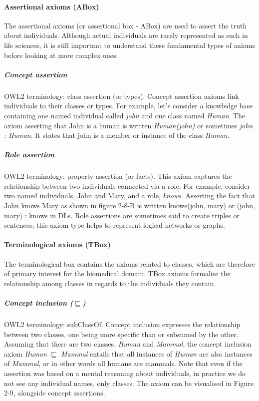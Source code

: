 \paragraph{\textbf{Assertional axioms (ABox)}\\}
The assertional axioms (or assertional box - ABox) are used to assert the truth about individuals. Although actual individuals are rarely represented as such in life sciences, it is still important to understand these fundamental types of axioms before looking at more complex ones.

\subparagraph{Concept assertion\\}
OWL2 terminology: class assertion (or types). Concept assertion axioms link individuals to their classes or types. For example, let's consider a knowledge base containing one named individual called \emph{john} and one class named \emph{Human}. The axiom asserting that John is a human is written \emph{Human(john)} or sometimes \emph{john : Human}. It states that john is a member or instance of the class \emph{Human}.

\subparagraph{Role assertion\\}
OWL2 terminology: property assertion (or facts). This axiom captures the relationship between two individuals connected via a role. For example, consider two named individuals, John and Mary, and a role, \emph{knows}. Asserting the fact that John knows Mary as shown in figure 2-8-B is written knows(john, mary) or (john, mary) : knows in DLs. Role assertions are sometimes said to create triples or sentences; this axiom type helps to represent logical networks or graphs.

\paragraph{\textbf{Terminological axioms (TBox)}\\}

The terminological box contains the axioms related to classes, which are therefore of primary interest for the biomedical domain. TBox axioms formalise the relationship among classes in regards to the individuals they contain.

\subparagraph{Concept inclusion ($ \sqsubseteq $)\\}
OWL2 terminology: subClassOf. Concept inclusion expresses the relationship between two classes, one being more specific than or subsumed by the other. Assuming that there are two classes, \emph{Human} and \emph{Mammal}, the concept inclusion axiom \emph{Human} $ \sqsubseteq $ \emph{Mammal} entails that all instances of \emph{Human} are also instances of \emph{Mammal}, or in other words all humans are mammals. Note that even if the assertion was based on a mental reasoning about individuals, in practice we do not see any individual names, only classes. The axiom can be visualised in Figure 2-9, alongside concept assertions.

